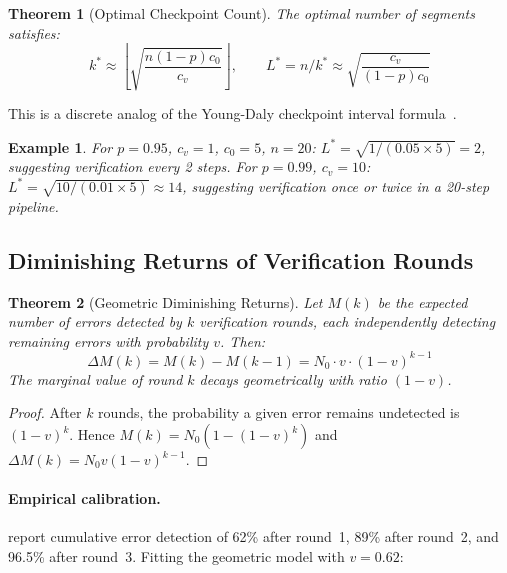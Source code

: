 \documentclass[11pt, a4paper, logo, copyright]{googledeepmind}
\newtheorem{theorem}{Theorem}[section]
\newtheorem{example}{Example}[section]
\begin{document}
\begin{theorem}[Optimal Checkpoint Count]
\label{thm:optcheckpoints}
The optimal number of segments satisfies:
\begin{equation}
k^* \approx \left\lfloor \sqrt{\frac{n(1-p) c_0}{c_v}} \right\rfloor, \qquad
L^* = n/k^* \approx \sqrt{\frac{c_v}{(1-p) c_0}}
\end{equation}
\end{theorem}

This is a discrete analog of the Young-Daly checkpoint interval formula~\citep{young1974first, daly2006higher}.

\begin{example}
For $p = 0.95$, $c_v = 1$, $c_0 = 5$, $n = 20$: $L^* = \sqrt{1/(0.05 \times 5)} = 2$, suggesting verification every 2 steps.
For $p = 0.99$, $c_v = 10$: $L^* = \sqrt{10/(0.01 \times 5)} \approx 14$, suggesting verification once or twice in a 20-step pipeline.
\end{example}

\subsection{Diminishing Returns of Verification Rounds}

\begin{theorem}[Geometric Diminishing Returns]
\label{thm:diminishing}
Let $M(k)$ be the expected number of errors detected by $k$ verification rounds, each independently detecting remaining errors with probability $v$.
Then:
\begin{equation}
\Delta M(k) = M(k) - M(k-1) = N_0 \cdot v \cdot (1-v)^{k-1}
\end{equation}
The marginal value of round $k$ decays geometrically with ratio $(1-v)$.
\end{theorem}

\begin{proof}
After $k$ rounds, the probability a given error remains undetected is $(1-v)^k$.
Hence $M(k) = N_0(1 - (1-v)^k)$ and $\Delta M(k) = N_0 v (1-v)^{k-1}$.
\end{proof}

\paragraph{Empirical calibration.}
\citet{hariharan2025plan} report cumulative error detection of 62\% after round~1, 89\% after round~2, and 96.5\% after round~3.
Fitting the geometric model with $v = 0.62$:
\end{document}
